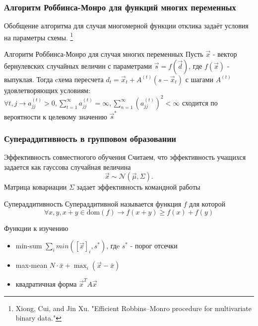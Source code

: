 \begin{frame}
    \frametitle{Алгоритм Роббинса-Монро для функций многих переменных}
    Обобщение алгоритма для случая многомерной функции отклика 
    задаёт условия на параметры схемы. \footnote{Xiong, Cui, and Jin Xu. "Efficient Robbins–Monro procedure for multivariate binary data."}
    \begin{block}{Алгоритм Роббинса-Монро для случая многих переменных}
        Пусть $\vec{x}$ - вектор бернулевских случайных величин с параметрами $\vec{s}=f(\vec{d})$, где $f(\vec{x})$ - выпуклая.
        Тогда cхема пересчета $d_t=\vec{x}_t + A^{(t)} (s - \vec{x}_t)$ с шагами $A^{(t)}$ удовлетворяющих условиям:
        $\forall t,j \rightarrow a_{jj}^{(t)} >0,
        \sum^{\infty}_{t=1} a_{jj}^{(t)} = \infty,
         \sum_{n=1}^\infty (a^{(t)}_{jj})^2 < \infty$
        сходится по вероятности к целевому значению $\vec{s}^*$
    \end{block}
\end{frame}


\begin{frame}
    \frametitle{Супераддитивность в групповом образовании}
    \begin{block}{Эффективность совместногого обучения}
        Считаем, что эффективность учащихся задается как гауссова случайная величина$$
            \vec{x} \sim \mathcal{N}(\vec{\mu}, \Sigma).
        $$
        Матрица ковариации $\Sigma$ задает эффективность командной работы
    \end{block}
    \begin{block}{Супераддитивность}
        Супераддитивной называется функция $f$ для которой
        \begin{equation}
            \forall x, y, x+y \in \text{dom}(f) \rightarrow f(x+y) \ge f(x) +f(y) 
        \end{equation}
    \end{block}

    \begin{block}{Функции к изучению}
        \begin{itemize}
            \item min-sum $\sum_{i} min([\vec{x}]_i,s^*)$, гдe $s^*$ - порог отсечки
            \item max-mean $N \cdot \bar{x} + \max_i(\vec{x} - \bar{x})$
            \item квадратичная форма $\vec{x}^T A \vec{x}$
        \end{itemize}
    \end{block}
\end{frame}